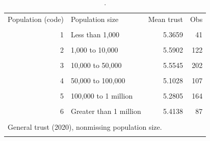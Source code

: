 \begin{table}[htbp]\centering
\caption{.}
\label{tab:trust_mean_by_population_2020}
\begin{tabular}{rlrr}\toprule
Population (code) & Population size & Mean trust & Obs \\\\ \midrule
1 & Less than 1,000 & 5.3659 & 41 \\\\
2 & 1,000 to 10,000 & 5.5902 & 122 \\\\
3 & 10,000 to 50,000 & 5.5545 & 202 \\\\
4 & 50,000 to 100,000 & 5.1028 & 107 \\\\
5 & 100,000 to 1 million & 5.2805 & 164 \\\\
6 & Greater than 1 million & 5.4138 & 87 \\\\
\bottomrule
\multicolumn{4}{l}{\footnotesize General trust (2020), nonmissing population size.} \\\\
\end{tabular}\end{table}
